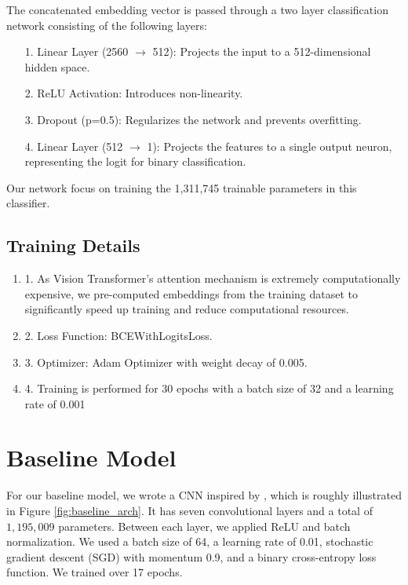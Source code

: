 \documentclass{article} %
\begin{document}
The concatenated embedding vector is passed through a two layer classification network consisting of the following layers:
\begin{enumerate}
    \item[1.]Linear Layer (2560 $\rightarrow$ 512): Projects the input to a 512-dimensional hidden space.
    \item[2.]ReLU Activation: Introduces non-linearity.
    \item[3.]Dropout (p=0.5): Regularizes the network and prevents overfitting.
    \item[4.]Linear Layer (512 $\rightarrow$ 1): Projects the features to a single output neuron, representing the logit for binary classification.
\end{enumerate}
Our network focus on training the 1,311,745 trainable parameters in this classifier. 


\subsection{Training Details}
\begin {enumerate}
    \item[1.]As Vision Transformer's attention mechanism is extremely computationally expensive, we pre-computed embeddings from the training dataset to significantly speed up training and reduce computational resources.
    \item[2.]Loss Function: BCEWithLogitsLoss.
    \item[3.]Optimizer: Adam Optimizer with weight decay of 0.005.
    \item[4.]Training is performed for 30 epochs with a batch size of 32 and a learning rate of 0.001
\end{enumerate}

\section{Baseline Model}

For our baseline model, we wrote a CNN inspired by \citet{wang2020cnngeneratedimagessurprisinglyeasy}, which is roughly illustrated in Figure \ref{fig:baseline_arch}. It has seven convolutional layers and a total of $1,195,009$ parameters. Between each layer, we applied ReLU and batch normalization. We used a batch size of 64, a learning rate of 0.01, stochastic gradient descent (SGD) with momentum 0.9, and a binary cross-entropy loss function. We trained over 17 epochs.
\end{document}
